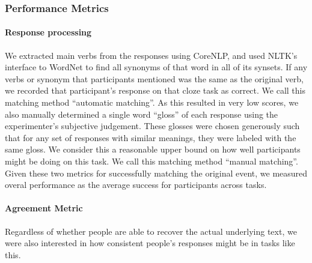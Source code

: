 \documentclass[10pt,a4paper]{article}
\begin{document}

\subsubsection{Performance Metrics}

\paragraph{Response processing}

We extracted main verbs from the responses using CoreNLP, and used NLTK's interface to WordNet \cite{bird2009natural, miller1998wordnet} to find all synonyms of that word in all of its synsets. If any verbs or synonym that participants mentioned was the same as the original verb, we recorded that participant's response on that cloze task as correct.
We call this matching method ``automatic matching''.
As this resulted in very low scores, we also manually determined a single word ``gloss'' of each response using the experimenter's subjective judgement. These glosses were chosen generously such that for any set of responses with similar meanings, they were labeled with the same gloss. We consider this a reasonable upper bound on how well participants might be doing on this task.
We call this matching method ``manual matching''.
Given these two metrics for successfully matching the original event, we measured overal performance as the average success for participants across tasks.

\paragraph{Agreement Metric}

Regardless of whether people are able to recover the actual underlying text, we were also interested in how consistent people's responses might be in tasks like this.
\end{document}

